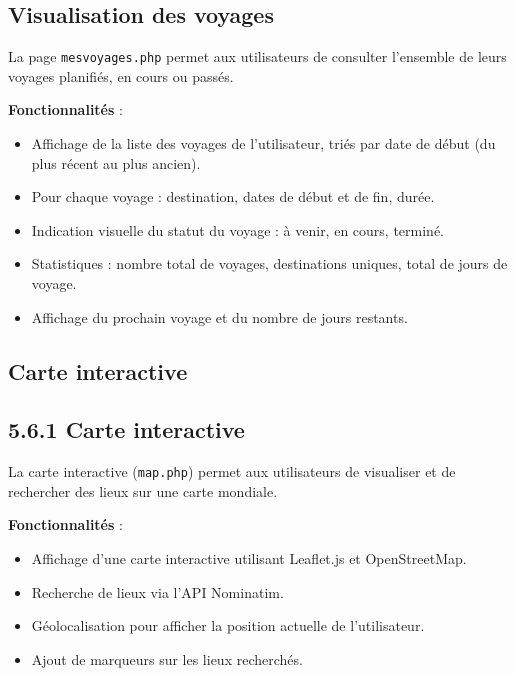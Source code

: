 \documentclass[a4paper,12pt]{article}
\begin{document}
\subsection{ Visualisation des voyages}

La page \texttt{mesvoyages.php} permet aux utilisateurs de consulter l'ensemble de leurs voyages planifiés, en cours ou passés.

\textbf{Fonctionnalités} :
\begin{itemize}
  \item Affichage de la liste des voyages de l'utilisateur, triés par date de début (du plus récent au plus ancien).
  \item Pour chaque voyage : destination, dates de début et de fin, durée.
  \item Indication visuelle du statut du voyage : à venir, en cours, terminé.
  \item Statistiques : nombre total de voyages, destinations uniques, total de jours de voyage.
  \item Affichage du prochain voyage et du nombre de jours restants.
\end{itemize}
\subsection{Carte interactive}
\subsection*{5.6.1 Carte interactive}

La carte interactive (\texttt{map.php}) permet aux utilisateurs de visualiser et de rechercher des lieux sur une carte mondiale.

\textbf{Fonctionnalités} :
\begin{itemize}
  \item Affichage d'une carte interactive utilisant Leaflet.js et OpenStreetMap.
  \item Recherche de lieux via l'API Nominatim.
  \item Géolocalisation pour afficher la position actuelle de l'utilisateur.
  \item Ajout de marqueurs sur les lieux recherchés.
\end{itemize}
\end{document}
